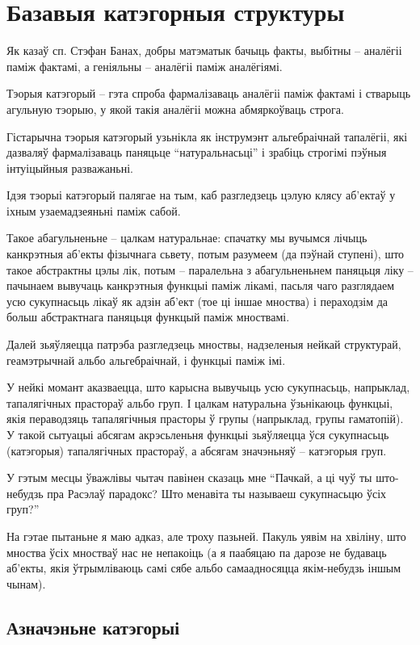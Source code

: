 \documentclass[a4paper,12pt]{book}
\begin{document}
\chapter{Базавыя катэгорныя структуры}

Як казаў сп. Стэфан Банах, добры матэматык бачыць факты, выбітны --
аналёгіі паміж фактамі, а геніяльны -- аналёгіі паміж аналёгіямі.

Тэорыя катэгорый -- гэта спроба фармалізаваць аналёгіі паміж фактамі і
стварыць агульную тэорыю, у якой такія аналёгіі можна абмяркоўваць
строга.

Гістарычна тэорыя катэгорый узьнікла як інструмэнт альгебраічнай
тапалёгіі, які дазваляў фармалізаваць паняцьце ``натуральнасьці'' і
зрабіць строгімі пэўныя інтуіцыйныя разважаньні.

Ідэя тэорыі катэгорый палягае на тым, каб разгледзець цэлую клясу
аб'ектаў у іхным узаемадзеяньні паміж сабой.

Такое абагульненьне -- цалкам натуральнае: спачатку мы вучымся лічыць
канкрэтныя аб'екты фізычнага сьвету, потым разумеем (да пэўнай ступені), што такое
абстрактны цэлы лік, потым -- паралельна з абагульненьнем паняцьця
ліку -- пачынаем вывучаць канкрэтныя функцыі паміж лікамі, пасьля чаго
разглядаем усю сукупнасьць лікаў як адзін аб'ект (тое ці іншае
мноства) і пераходзім да больш абстрактнага паняцьця функцый паміж
мноствамі.

Далей зьяўляецца патрэба разгледзець мноствы, надзеленыя нейкай
структурай, геамэтрычнай альбо альгебраічнай, і функцыі паміж імі.

У нейкі момант аказваецца, што карысна вывучыць усю сукупнасьць,
напрыклад, тапалягічных прастораў альбо груп. І цалкам натуральна
ўзьнікаюць функцыі, якія пераводзяць тапалягічныя прасторы ў групы
(напрыклад, групы гаматопій). У такой сытуацыі абсягам акрэсьленьня
функцыі зьяўляецца ўся сукупнасьць (катэгорыя) тапалягічных прастораў,
а абсягам значэньняў -- катэгорыя груп.

У гэтым месцы ўважлівы чытач павінен сказаць мне ``Пачкай, а ці чуў ты
што-небудзь пра Расэлаў парадокс? Што менавіта ты называеш сукупнасьцю
ўсіх груп?''

На гэтае пытаньне я маю адказ, але троху пазьней. Пакуль уявім на
хвіліну, што мноства ўсіх мностваў нас не непакоіць (а я паабяцаю па
дарозе не будаваць аб'екты, якія ўтрымліваюць самі сябе альбо
самаадносяцца якім-небудзь іншым чынам).

\section{Азначэньне катэгорыі}
\end{document}
